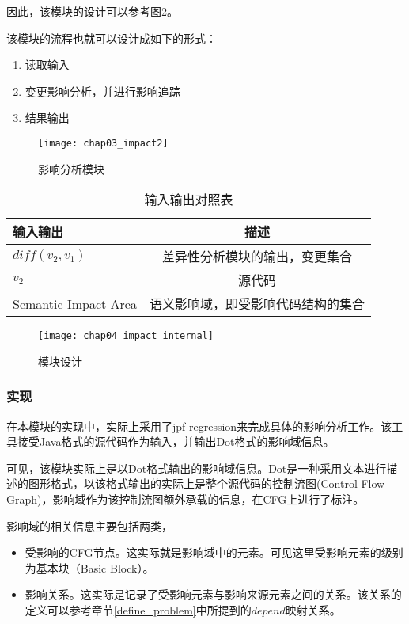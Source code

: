 因此，该模块的设计可以参考图\ref {des_impact}。

该模块的流程也就可以设计成如下的形式：
\begin{enumerate}
	\item 读取输入
	\item 变更影响分析，并进行影响追踪
	\item 结果输出
\end{enumerate}

\begin{figure}[H]
	\centering
	\texttt{[image: chap03\_impact2]}
	\caption {影响分析模块}
	\label {impact}	
\end{figure}


\begin{table}[H]
	\caption{输入输出对照表}
	\label{impact_io}
	\centering
	\begin{tabular}{lc}
		\toprule[1.5pt]
		{\heiti 输入输出} & {\heiti 描述} \\\midrule[1pt]
		$diff(v_2,v_1)$ & 差异性分析模块的输出，变更集合 \\
		$v_2$ & 源代码 \\
		Semantic Impact Area & 语义影响域，即受影响代码结构的集合\\
		\bottomrule[1.5pt]
	\end{tabular}
\end{table}

\begin{figure}[H]
	\centering
	\texttt{[image: chap04\_impact\_internal]}
	\caption {模块设计}
	\label {des_impact}	
\end{figure}

\subsubsection{实现}


在本模块的实现中，实际上采用了jpf-regression来完成具体的影响分析工作。该工具接受Java格式的源代码作为输入，并输出Dot格式的影响域信息。

可见，该模块实际上是以Dot格式输出的影响域信息。Dot是一种采用文本进行描述的图形格式，以该格式输出的实际上是整个源代码的控制流图(Control Flow Graph)，影响域作为该控制流图额外承载的信息，在CFG上进行了标注。

影响域的相关信息主要包括两类，
\begin{itemize}
	\item 受影响的CFG节点。这实际就是影响域中的元素。可见这里受影响元素的级别为基本块（Basic Block）。
	\item 影响关系。这实际是记录了受影响元素与影响来源元素之间的关系。该关系的定义可以参考章节\ref {define_problem}中所提到的$depend$映射关系。
\end{itemize}

